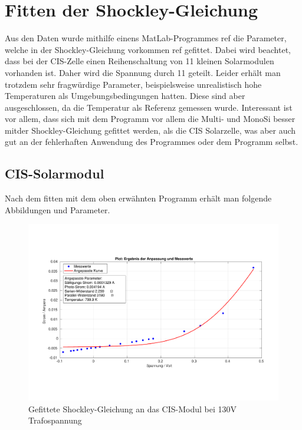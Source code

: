 
\clearpage
\section{Fitten der Shockley-Gleichung}
\label{chapter:fitten}

Aus den Daten wurde mithilfe einens MatLab-Programmes ref die Parameter, welche in der Shockley-Gleichung vorkommen ref gefittet. Dabei wird beachtet, 
dass bei der CIS-Zelle einen Reihenschaltung von 11 kleinen Solarmodulen vorhanden ist. Daher wird die Spannung durch 11 geteilt. Leider erhält man 
trotzdem sehr fragwürdige Parameter, beispielsweise unrealistisch hohe Temperaturen als Umgebungsbedingungen hatten. Diese sind aber ausgeschlossen, 
da die Temperatur als Referenz gemessen wurde.
Interessant ist vor allem, dass sich mit dem Programm vor allem die Multi- und MonoSi besser mitder Shockley-Gleichung gefittet werden, als 
die CIS Solarzelle, was aber auch gut an der fehlerhaften Anwendung des Programmes oder dem Programm selbst.

\subsection{CIS-Solarmodul}

Nach dem fitten mit dem oben erwähnten Programm erhält man folgende Abbildungen und Parameter.

\begin{figure}[ht]
    \centering
    \includegraphics[width = \linewidth]{Bilder/CIS130Plot.pdf}
    \caption{Gefittete Shockley-Gleichung an das CIS-Modul bei 130V Trafospannung}
    
\end{figure}

